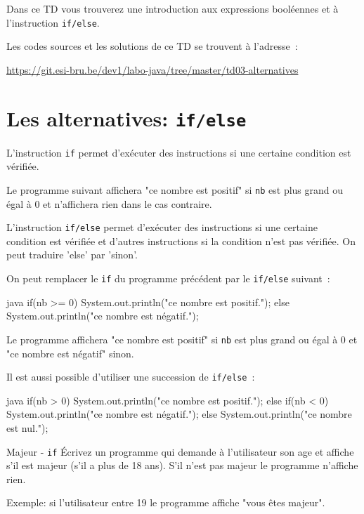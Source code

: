 \documentclass[a4paper,11pt]{article}
\date{2018 -- 2019}
\newcommand{\publicbasepath}{https://git.esi-bru.be/dev1/labo-java/tree/master/td03-alternatives}
\begin{document}
\entete
\titre
{}
\lastedit


	Dans ce TD vous trouverez une introduction 	aux expressions booléennes et à
	l'instruction \texttt{if/else}.
	
	Les codes sources et les solutions de ce TD se trouvent à l'adresse~: 
	
	\url{\publicbasepath}	
	

	
	\tableofcontents

	\newpage


\section{Les alternatives: \texttt{if/else}}

	L'instruction \texttt{if} permet d'exécuter des instructions si une certaine condition est vérifiée.
	
	Le programme suivant affichera "ce nombre est positif" 
	si \texttt{nb} est plus grand ou égal à 0 et n'affichera rien dans le cas contraire.
	 

	L'instruction \texttt{if/else} permet d'exécuter des instructions si une certaine condition est vérifiée
	et d'autres instructions si la condition n'est pas vérifiée. On peut traduire 'else' par 'sinon'.
	
	On peut remplacer le \texttt{if} du programme précédent par le \texttt{if/else} suivant~:
	
	\begin{Code}{java}
		if(nb >= 0) {
			System.out.println("ce nombre est positif.");
		} else {
			System.out.println("ce nombre est négatif.");
		}
	\end{Code}

	Le programme affichera "ce nombre est positif" 
	si \texttt{nb} est plus grand ou égal à 0 et "ce nombre est négatif" sinon.


	Il est aussi possible d'utiliser une succession de \texttt{if/else}~:
		
	\begin{Code}{java}
		if(nb > 0) {
			System.out.println("ce nombre est positif.");
		} else if(nb < 0) {
			System.out.println("ce nombre est négatif.");
		} else {
			System.out.println("ce nombre est nul.");
		}
	\end{Code}

	
	\begin{Exercice}{Majeur - \texttt{if}}
		\'Ecrivez un programme qui demande à l'utilisateur 
		son age et affiche s'il est majeur (s'il a plus de 18 ans). 
		S'il n'est pas majeur le programme n'affiche rien.
		
		Exemple: si l'utilisateur entre 19 le programme affiche "vous êtes majeur". 
	\end{Exercice}
\end{document}
